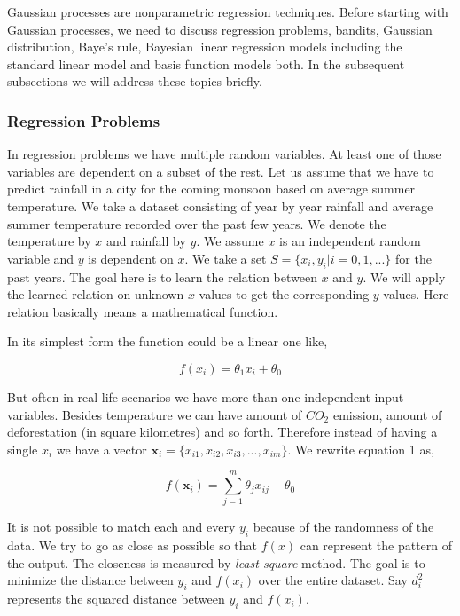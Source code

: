\documentclass[english]{tktltiki}
\begin{document}
Gaussian processes are nonparametric regression techniques. Before starting with Gaussian processes, we need to discuss regression problems, bandits, Gaussian distribution, Baye's rule, Bayesian linear regression models including the standard linear model and basis function models both. In the subsequent subsections we will address these topics briefly.

\subsubsection{Regression Problems}
\label{subsec:reg_prob}

In regression problems we have multiple random variables. At least one of those variables are dependent on a subset of the rest. Let us assume that we have to predict rainfall in a city for the coming monsoon based on average summer temperature. We take a dataset consisting of year by year rainfall and average summer temperature recorded over the past few years. We denote the temperature by $x$ and rainfall by $y$. We assume $x$ is an independent random variable and $y$ is dependent on $x$. We take a set $S = \{x_i, y_i|i = 0, 1, ...\}$ for the past years. The goal here is to learn the relation between $x$ and $y$. We will apply the learned relation on unknown $x$ values to get the corresponding $y$ values. Here relation basically means a mathematical function.

In its simplest form the function could be a linear one like,

\begin{equation}
f(x_i) = \theta_1 x_i + \theta_0
\end{equation}


But often in real life scenarios we have more than one independent input variables. Besides temperature we can have amount of $CO_2$ emission, amount of deforestation (in square kilometres) and so forth. Therefore instead of having a single $x_i$ we have a vector $\mathbf{x}_i = \{x_{i1}, x_{i2}, x_{i3}, ..., x_{im}\}$. We rewrite equation 1 as,

\begin{equation}
f(\mathbf{x}_i) = \sum_{j=1}^m \theta_j x_{ij} + \theta_0
\end{equation}

It is not possible to match each and every $y_i$ because of the randomness of the data. We try to go as close as possible so that $f(x)$ can represent the pattern of the output. The closeness is measured by \textit{least square} method. The goal is to minimize the distance between $y_i$ and $f(x_i)$ over the entire dataset. Say $d^2_i$ represents the squared distance between $y_i$ and $f(x_i)$.
\end{document}
